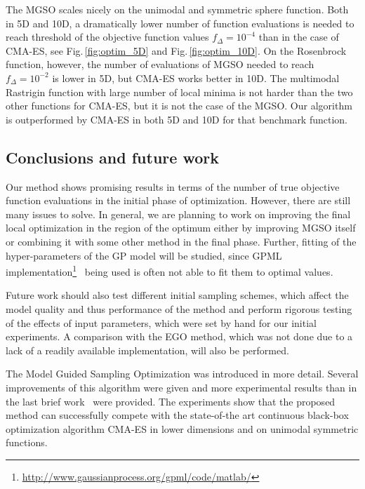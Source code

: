 \documentclass{itatnew}
\begin{document}
The MGSO scales nicely on the unimodal and symmetric sphere function. Both in 5D and 10D, a dramatically lower number of function evaluations is needed to reach threshold of the objective function values $f_{\Delta} = 10^{-4}$ than in the case of CMA-ES, see Fig.\,\ref{fig:optim_5D} and Fig.\,\ref{fig:optim_10D}. On the Rosenbrock function, however, the number of evaluations of MGSO needed to reach $f_{\Delta} = 10^{-2}$ is lower in 5D, but CMA-ES works better in 10D. The multimodal Rastrigin function with large number of local minima is not harder than the two other functions for CMA-ES, but it is not the case of the MGSO. Our algorithm is outperformed by CMA-ES in both 5D and 10D for that benchmark function.


\subsection{Conclusions and future work}

Our method shows promising results in terms of the number of true objective function evaluations in the initial phase of optimization. However, there are still many issues to solve. In general, we are planning to work on improving the final local optimization in the region of the optimum either by improving MGSO itself or combining it with some other method in the final phase. Further, fitting of the hyper-parameters of the GP model will be studied, since GPML implementation\footnote{\url{http://www.gaussianprocess.org/gpml/code/matlab/}}~\cite{rasmussen_gaussian_2010} being used is often not able to fit them to optimal values.

Future work should also test different initial sampling schemes, which affect the model quality and thus performance of the method and perform rigorous testing of the effects of input parameters, which were set by hand for our initial experiments. A comparison with the EGO method, which was not done due to a lack of a readily available implementation, will also be performed. 

The Model Guided Sampling Optimization was introduced in more detail. Several improvements of this algorithm were given and more experimental results than in the last brief work~\cite{bajer_model_2013} were provided. The experiments show that the proposed method can successfully compete with the state-of-the art continuous black-box optimization algorithm CMA-ES in lower dimensions and on unimodal symmetric functions.
\end{document}
